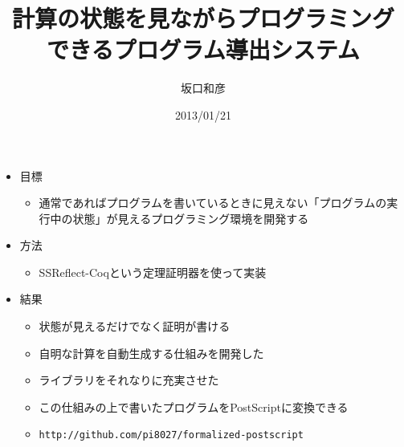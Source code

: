 \documentclass[cjk, 14pt, dvipdfm]{beamer}
\title{\large{計算の状態を見ながらプログラミング\\できるプログラム導出システム}}
\author{坂口和彦}
\institute{情報学群 情報科学類 B2}
\date{2013/01/21}
\begin{document}
\begin{frame}[plain]

 \maketitle

\end{frame}

\begin{frame}[plain]

 \begin{itemize}
  \item 目標
  \begin{itemize}
    \item 通常であればプログラムを書いているときに見えない「プログラムの実行中の状態」が見えるプログラミング環境を開発する
  \end{itemize}
  \item 方法
  \begin{itemize}
    \item SSReflect-Coqという定理証明器を使って実装
  \end{itemize}
  \item 結果
  \begin{itemize}
    \item 状態が見えるだけでなく証明が書ける
    \item 自明な計算を自動生成する仕組みを開発した
    \item ライブラリをそれなりに充実させた
    \item この仕組みの上で書いたプログラムをPostScriptに変換できる
    \item \footnotesize\texttt{http://github.com/pi8027/formalized-postscript}
  \end{itemize}
 \end{itemize}

\end{frame}
\end{document}
